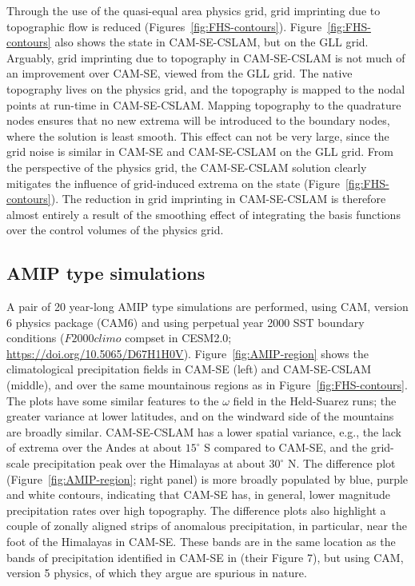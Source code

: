 \documentclass[twocol]{ametsoc}
\begin{document}
Through the use of the quasi-equal area physics grid, grid imprinting due to topographic flow is reduced (Figures~\ref{fig:FHS-contours}). Figure~\ref{fig:FHS-contours} also shows the state in CAM-SE-CSLAM, but on the GLL grid. Arguably, grid imprinting due to topography in CAM-SE-CSLAM is not much of an improvement over CAM-SE, viewed from the GLL grid. The native topography lives on the physics grid, and the topography is mapped to the nodal points at run-time in CAM-SE-CSLAM. Mapping topography to the quadrature nodes ensures that no new extrema will be introduced to the boundary nodes, where the solution is least smooth. This effect can not be very large, since the grid noise is similar in CAM-SE and CAM-SE-CSLAM on the GLL grid. From the perspective of the physics grid, the CAM-SE-CSLAM solution clearly mitigates the influence of grid-induced extrema on the state (Figure~\ref{fig:FHS-contours}). The reduction in grid imprinting in CAM-SE-CSLAM is therefore almost entirely a result of the smoothing effect of integrating the basis functions over the control volumes of the physics grid.

\subsection{{\color{red}AMIP type simulations{}}}

{\color{red}A pair of 20 year-long AMIP type simulations are performed, using CAM, version 6 physics package (CAM6) and using perpetual year 2000 SST boundary conditions ($F2000climo$ compset in CESM2.0; \url{https://doi.org/10.5065/D67H1H0V}). Figure~\ref{fig:AMIP-region} shows the climatological precipitation fields in CAM-SE (left) and CAM-SE-CSLAM (middle), and over the same mountainous regions as in Figure~\ref{fig:FHS-contours}. The plots have some similar features to the $\omega$ field in the Held-Suarez runs; the greater variance at lower latitudes, and on the windward side of the mountains are broadly similar. CAM-SE-CSLAM has a lower spatial variance, e.g., the lack of extrema over the Andes at about $15^\circ$ S compared to CAM-SE, and the grid-scale precipitation peak over the Himalayas at about $30^\circ$ N. The difference plot (Figure~\ref{fig:AMIP-region}; right panel) is more broadly populated by blue, purple and white contours, indicating that CAM-SE has, in general, lower magnitude precipitation rates over high topography. The difference plots also highlight a couple of zonally aligned strips of anomalous precipitation, in particular, near the foot of the Himalayas in CAM-SE. These bands are in the same location as the bands of precipitation identified in CAM-SE in \cite{gmdd-8-4623-2015} (their Figure 7), but using CAM, version 5 physics, of which they argue are spurious in nature.} 
\end{document}
